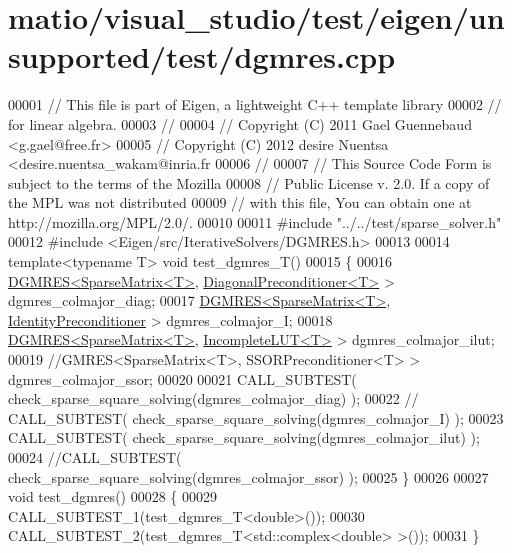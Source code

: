 \hypertarget{matio_2visual__studio_2test_2eigen_2unsupported_2test_2dgmres_8cpp_source}{}\section{matio/visual\+\_\+studio/test/eigen/unsupported/test/dgmres.cpp}
\label{matio_2visual__studio_2test_2eigen_2unsupported_2test_2dgmres_8cpp_source}

\begin{DoxyCode}
00001 \textcolor{comment}{// This file is part of Eigen, a lightweight C++ template library}
00002 \textcolor{comment}{// for linear algebra.}
00003 \textcolor{comment}{//}
00004 \textcolor{comment}{// Copyright (C) 2011 Gael Guennebaud <g.gael@free.fr>}
00005 \textcolor{comment}{// Copyright (C) 2012 desire Nuentsa <desire.nuentsa\_wakam@inria.fr}
00006 \textcolor{comment}{//}
00007 \textcolor{comment}{// This Source Code Form is subject to the terms of the Mozilla}
00008 \textcolor{comment}{// Public License v. 2.0. If a copy of the MPL was not distributed}
00009 \textcolor{comment}{// with this file, You can obtain one at http://mozilla.org/MPL/2.0/.}
00010 
00011 \textcolor{preprocessor}{#include "../../test/sparse\_solver.h"}
00012 \textcolor{preprocessor}{#include <Eigen/src/IterativeSolvers/DGMRES.h>}
00013 
00014 \textcolor{keyword}{template}<\textcolor{keyword}{typename} T> \textcolor{keywordtype}{void} test\_dgmres\_T()
00015 \{
00016   \hyperlink{class_eigen_1_1_d_g_m_r_e_s}{DGMRES<SparseMatrix<T>}, \hyperlink{group___iterative_linear_solvers___module_class_eigen_1_1_diagonal_preconditioner}{DiagonalPreconditioner<T>} > 
      dgmres\_colmajor\_diag;
00017   \hyperlink{class_eigen_1_1_d_g_m_r_e_s}{DGMRES<SparseMatrix<T>}, \hyperlink{group___iterative_linear_solvers___module_class_eigen_1_1_identity_preconditioner}{IdentityPreconditioner}    > 
      dgmres\_colmajor\_I;
00018   \hyperlink{class_eigen_1_1_d_g_m_r_e_s}{DGMRES<SparseMatrix<T>}, \hyperlink{group___iterative_linear_solvers___module_class_eigen_1_1_incomplete_l_u_t}{IncompleteLUT<T>} >           
      dgmres\_colmajor\_ilut;
00019   \textcolor{comment}{//GMRES<SparseMatrix<T>, SSORPreconditioner<T> >     dgmres\_colmajor\_ssor;}
00020 
00021   CALL\_SUBTEST( check\_sparse\_square\_solving(dgmres\_colmajor\_diag)  );
00022 \textcolor{comment}{//   CALL\_SUBTEST( check\_sparse\_square\_solving(dgmres\_colmajor\_I)     );}
00023   CALL\_SUBTEST( check\_sparse\_square\_solving(dgmres\_colmajor\_ilut)     );
00024   \textcolor{comment}{//CALL\_SUBTEST( check\_sparse\_square\_solving(dgmres\_colmajor\_ssor)     );}
00025 \}
00026 
00027 \textcolor{keywordtype}{void} test\_dgmres()
00028 \{
00029   CALL\_SUBTEST\_1(test\_dgmres\_T<double>());
00030   CALL\_SUBTEST\_2(test\_dgmres\_T<std::complex<double> >());
00031 \}
\end{DoxyCode}
